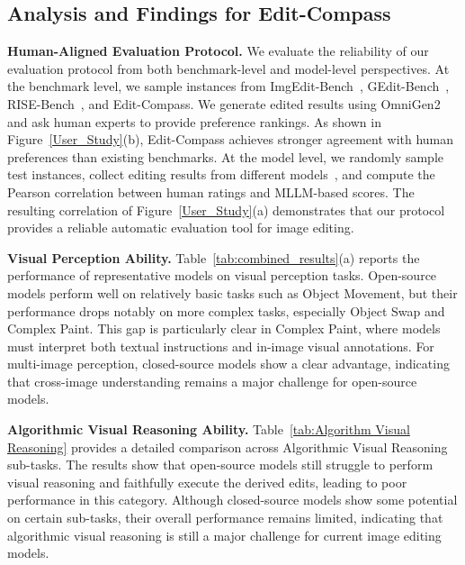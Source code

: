\documentclass{llmxive}
\providecommand{\bench}{Edit-Compass}
\begin{document}
\subsection{Analysis and Findings for {\bench}}

\textbf{Human-Aligned Evaluation Protocol.}
We evaluate the reliability of our evaluation protocol from both benchmark-level and model-level perspectives. At the benchmark level, we sample instances from ImgEdit-Bench~\cite{ye2025imgedit}, GEdit-Bench~\cite{liu2025step1x}, RISE-Bench~\cite{zhao2025envisioning}, and {\bench}. We generate edited results using OmniGen2 and ask human experts to provide preference rankings. As shown in Figure~\ref{User_Study}(b), {\bench} achieves stronger agreement with human preferences than existing benchmarks.
At the model level, we randomly sample test instances, collect editing results from different models~\cite{wu2025qwen,flux-2-2025,nanobananapro,deng2025emerging}, and compute the Pearson correlation between human ratings and MLLM-based scores. The resulting correlation of Figure~\ref{User_Study}(a) demonstrates that our protocol provides a reliable automatic evaluation tool for image editing.



\textbf{Visual Perception Ability.}
Table~\ref{tab:combined_results}(a) reports the performance of representative models on visual perception tasks. Open-source models perform well on relatively basic tasks such as Object Movement, but their performance drops notably on more complex tasks, especially Object Swap and Complex Paint. This gap is particularly clear in Complex Paint, where models must interpret both textual instructions and in-image visual annotations. For multi-image perception, closed-source models show a clear advantage, indicating that cross-image understanding remains a major challenge for open-source models.

\textbf{Algorithmic Visual Reasoning Ability.}
Table~\ref{tab:Algorithm Visual Reasoning} provides a detailed comparison across Algorithmic Visual Reasoning sub-tasks. The results show that open-source models still struggle to perform visual reasoning and faithfully execute the derived edits, leading to poor performance in this category. Although closed-source models show some potential on certain sub-tasks, their overall performance remains limited, indicating that algorithmic visual reasoning is still a major challenge for current image editing models.
\end{document}

